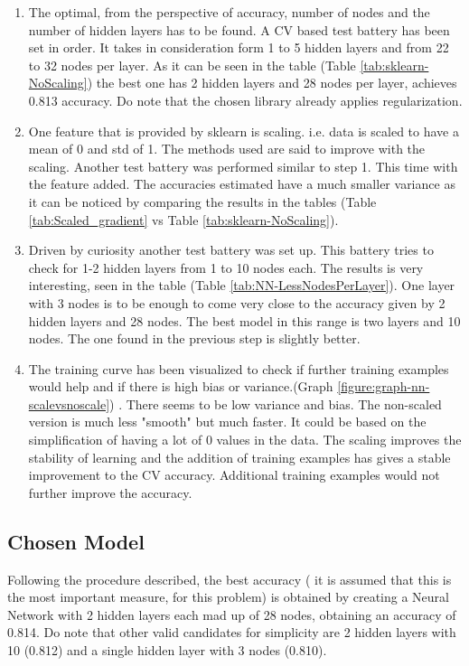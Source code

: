 \documentclass{article}
\begin{document}
\begin{enumerate}
	\item The optimal, from the perspective of accuracy, number of nodes and the number of hidden layers has to be found. A CV based test battery has been set in order. It takes in consideration form 1 to 5 hidden layers and from 22 to 32 nodes per layer. As it can be seen in the table (Table \ref{tab:sklearn-NoScaling}) the best one has 2 hidden layers and 28 nodes per layer, achieves 0.813 accuracy. Do note that the chosen library already applies regularization.
	
	\item One feature that is provided by sklearn is scaling. i.e. data is scaled to have a mean of 0 and std of 1. The methods used are said to improve with the scaling. Another test battery was performed similar to step 1. This time with the feature added. The accuracies estimated have a much smaller variance as it can be noticed by comparing the results in the tables (Table \ref{tab:Scaled_gradient} vs Table  \ref{tab:sklearn-NoScaling}).
	
	\item Driven by curiosity another test battery was set up. This battery tries to check for 1-2 hidden layers from 1 to 10 nodes each. The results is very interesting, seen in the table (Table \ref{tab:NN-LessNodesPerLayer}). One layer with 3 nodes is to be enough to come very close to the accuracy given by 2 hidden layers and 28 nodes. The best model in this range is two layers and 10 nodes. The one found in the previous step is slightly better.
	
	\item The training curve has been visualized to check if further training examples would help and if there is high bias or variance.(Graph  \ref{figure:graph-nn-scalevsnoscale}) . There seems to be low variance and bias. The non-scaled version is much less "smooth" but much faster. It could be based on the simplification of having a lot of 0 values in the data. The scaling improves the stability of learning and the addition of training examples has gives a stable improvement to the CV accuracy. Additional training examples would not further improve the accuracy.
	
\end{enumerate}


\subsection{Chosen Model}
Following the procedure described, the best accuracy ( it is assumed that this is the most important measure, for this problem) is obtained by creating a Neural Network with 2 hidden layers each mad up of 28 nodes, obtaining an accuracy of 0.814. Do note that other valid candidates for simplicity are 2 hidden layers with 10 (0.812) and a single hidden layer with 3 nodes (0.810).
\end{document}
